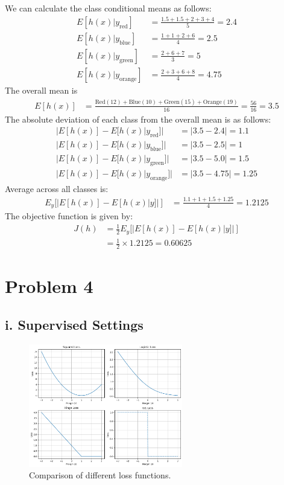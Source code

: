 \documentclass{article}
\begin{document}
\noindent We can calculate the class conditional means as follows:
\begin{align}
    E[h(x) | y_{\text{red}}] &= \frac{1.5 + 1.5 + 2 + 3 + 4}{5} = 2.4\\
    E[h(x) | y_{\text{blue}}] &= \frac{1 + 1 + 2 + 6}{4} = 2.5\\
    E[h(x) | y_{\text{green}}] &= \frac{2 + 6 + 7}{3} = 5\\
    E[h(x) | y_{\text{orange}}] &= \frac{2 + 3 + 6 + 8}{4} = 4.75
\end{align}
The overall mean is 
\begin{align}
    E[h(x)] &= \frac{\text{Red}(12) + \text{Blue}(10)+ \text{Green}(15) + \text{Orange}(19)}{16} = \frac{56}{16} = 3.5
\end{align}
The absolute deviation of each class from the overall mean is as follows:
\begin{align}
    |E[h(x)] - E[h(x) | y_{\text{red}}]| &= |3.5 - 2.4| = 1.1\\
    |E[h(x)] - E[h(x) | y_{\text{blue}}]| &= |3.5 - 2.5| = 1\\
    |E[h(x)] - E[h(x) | y_{\text{green}}]| &= |3.5 - 5.0| =1.5\\
    |E[h(x)] - E[h(x) | y_{\text{orange}}]| &= |3.5 - 4.75| = 1.25
\end{align}
Average across all classes is:
\begin{align}
    E_y[|E[h(x)] - E[h(x) | y]|] &= \frac{1.1 + 1 + 1.5 + 1.25}{4} = 1.2125
\end{align}
The objective function is given by:
\begin{align}
    J(h) &= \frac{1}{2}E_y[|E[h(x)] - E[h(x) | y]|]\\
    &= \frac{1}{2} \times 1.2125 = 0.60625
\end{align}

\newpage
\section*{Problem 4}

\subsection*{i. Supervised Settings}

\begin{figure}[ht]
    \centering
    \includegraphics[width=0.6\textwidth]{loss.png}
    \caption{Comparison of different loss functions.}
    \label{fig:losses}
    
\end{figure}
\end{document}
